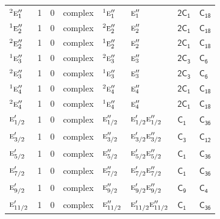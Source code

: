 \documentclass[10pt,a4paper]{article}
\makeatletter
\def\grouprule#1#2{\noalign{\marks\LTgroupmarks{\the\belowrulesep}\nobreak\vskip#1%
  \vskip\aboverulesep}\multispan\LT@cols\unskip{\leaders\hrule\@height#2\hfill\kern\z@}\cr
  \noalign{\penalty\LTrulebreak\vskip\belowrulesep\global\@lastruleclass\z@}}
\numberwithin{equation}{section}
\newcommand{\grp}[1]{\mathsf{#1}}
\newcommand{\irr}[1]{\text{\normalfont\scshape #1}}
\newcommand{\conjpair}[1]{{}^{#1}}
\makeatother
\begin{document}
{\begin{longtable}{@{}lrrlllll@{}}
$\conjpair{2}\irr{e}_{1}''$ & 1 & $0$ & complex & $\conjpair{1}\irr{e}_{1}''$ & $\irr{e}_{1}''$ & \href{2C1.pdf}{$\grp{2C_{1}}$} & $\grp{C_{18}}$\\
$\conjpair{1}\irr{e}_{2}''$ & 1 & $0$ & complex & $\conjpair{2}\irr{e}_{2}''$ & $\irr{e}_{2}''$ & \href{2C1.pdf}{$\grp{2C_{1}}$} & $\grp{C_{18}}$\\
$\conjpair{2}\irr{e}_{2}''$ & 1 & $0$ & complex & $\conjpair{1}\irr{e}_{2}''$ & $\irr{e}_{2}''$ & \href{2C1.pdf}{$\grp{2C_{1}}$} & $\grp{C_{18}}$\\
$\conjpair{1}\irr{e}_{3}''$ & 1 & $0$ & complex & $\conjpair{2}\irr{e}_{3}''$ & $\irr{e}_{3}''$ & \href{2C3.pdf}{$\grp{2C_{3}}$} & \href{../../../rotation/data/pdf/C6.pdf}{$\grp{C_{6}}$}\\
$\conjpair{2}\irr{e}_{3}''$ & 1 & $0$ & complex & $\conjpair{1}\irr{e}_{3}''$ & $\irr{e}_{3}''$ & \href{2C3.pdf}{$\grp{2C_{3}}$} & \href{../../../rotation/data/pdf/C6.pdf}{$\grp{C_{6}}$}\\
$\conjpair{1}\irr{e}_{4}''$ & 1 & $0$ & complex & $\conjpair{2}\irr{e}_{4}''$ & $\irr{e}_{4}''$ & \href{2C1.pdf}{$\grp{2C_{1}}$} & $\grp{C_{18}}$\\
$\conjpair{2}\irr{e}_{4}''$ & 1 & $0$ & complex & $\conjpair{1}\irr{e}_{4}''$ & $\irr{e}_{4}''$ & \href{2C1.pdf}{$\grp{2C_{1}}$} & $\grp{C_{18}}$\\
\grouprule{0pt}{\lightrulewidth}
$\irr{e}_{1/2}'$ & 1 & $0$ & complex & $\irr{e}_{1/2}''$ & $\irr{e}_{1/2}'\irr{e}_{1/2}''$ & \href{C1.pdf}{$\grp{C_{1}}$} & $\grp{C_{36}}$\\
$\irr{e}_{3/2}'$ & 1 & $0$ & complex & $\irr{e}_{3/2}''$ & $\irr{e}_{3/2}'\irr{e}_{3/2}''$ & \href{C3.pdf}{$\grp{C_{3}}$} & \href{../../../rotation/data/pdf/C12.pdf}{$\grp{C_{12}}$}\\
$\irr{e}_{5/2}'$ & 1 & $0$ & complex & $\irr{e}_{5/2}''$ & $\irr{e}_{5/2}'\irr{e}_{5/2}''$ & \href{C1.pdf}{$\grp{C_{1}}$} & $\grp{C_{36}}$\\
$\irr{e}_{7/2}'$ & 1 & $0$ & complex & $\irr{e}_{7/2}''$ & $\irr{e}_{7/2}'\irr{e}_{7/2}''$ & \href{C1.pdf}{$\grp{C_{1}}$} & $\grp{C_{36}}$\\
$\irr{e}_{9/2}'$ & 1 & $0$ & complex & $\irr{e}_{9/2}''$ & $\irr{e}_{9/2}'\irr{e}_{9/2}''$ & \href{C9.pdf}{$\grp{C_{9}}$} & \href{../../../rotation/data/pdf/C4.pdf}{$\grp{C_{4}}$}\\
$\irr{e}_{11/2}'$ & 1 & $0$ & complex & $\irr{e}_{11/2}''$ & $\irr{e}_{11/2}'\irr{e}_{11/2}''$ & \href{C1.pdf}{$\grp{C_{1}}$} & $\grp{C_{36}}$\\

\end{longtable}}
\end{document}
